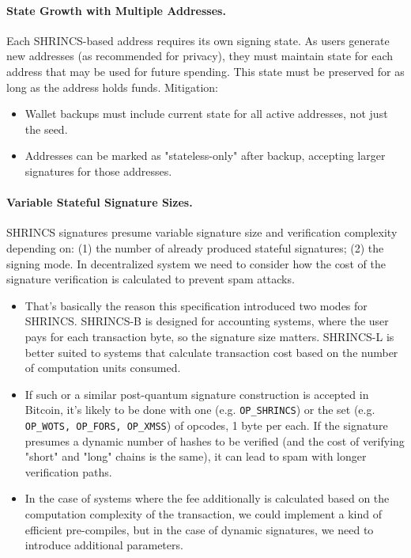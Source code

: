 \paragraph{State Growth with Multiple Addresses.}
Each SHRINCS-based address requires its own signing state. As users generate new addresses (as recommended for privacy), they must maintain state for each address that may be used for future spending. This state must be preserved for as long as the address holds funds. Mitigation:
\begin{itemize}
    \item Wallet backups must include current state for all active addresses, not just the seed.
    \item Addresses can be marked as "stateless-only" after backup, accepting larger signatures for those addresses.
\end{itemize}

\paragraph{Variable Stateful Signature Sizes.}
SHRINCS signatures presume variable signature size and verification complexity depending on: (1) the number of already produced stateful signatures; (2) the signing mode. In decentralized system we need to consider how the cost of the signature verification is calculated to prevent spam attacks.
\begin{itemize}
    \item That's basically the reason this specification introduced two modes for SHRINCS. SHRINCS-B is designed for accounting systems, where the user pays for each transaction byte, so the signature size matters. SHRINCS-L is better suited to systems that calculate transaction cost based on the number of computation units consumed.
    \item If such or a similar post-quantum signature construction is accepted in Bitcoin, it's likely to be done with one (e.g. \texttt{OP\_SHRINCS}) or the set (e.g. \texttt{OP\_WOTS, OP\_FORS, OP\_XMSS}) of opcodes, 1 byte per each. If the signature presumes a dynamic number of hashes to be verified (and the cost of verifying "short" and "long" chains is the same), it can lead to spam with longer verification paths. 
    \item In the case of systems where the fee additionally is calculated based on the computation complexity of the transaction, we could implement a kind of efficient pre-compiles, but in the case of dynamic signatures, we need to introduce additional parameters. 
\end{itemize}